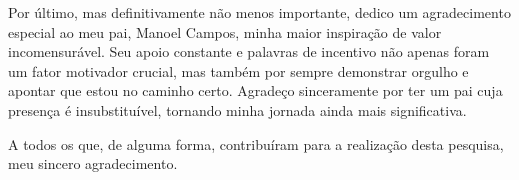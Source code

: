 \begin{agradecimentos}
Por último, mas definitivamente não menos importante, dedico um agradecimento especial ao meu pai, Manoel Campos, minha maior inspiração de valor incomensurável. Seu apoio constante e palavras de incentivo não apenas foram um fator motivador crucial, mas também por sempre demonstrar orgulho e apontar que estou no caminho certo. Agradeço sinceramente por ter um pai cuja presença é insubstituível, tornando minha jornada ainda mais significativa.

A todos os que, de alguma forma, contribuíram para a realização desta pesquisa, meu sincero agradecimento.

\end{agradecimentos}
